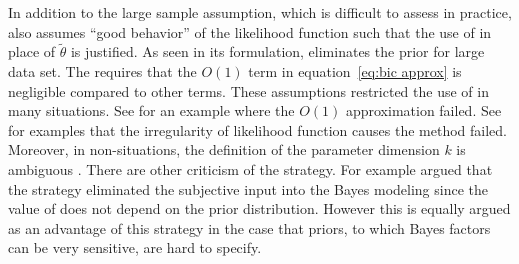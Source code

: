 In addition to the large sample assumption, which is difficult to assess in
practice, \bic also assumes ``good behavior'' of the likelihood function such
that the use of \mle in place of $\tilde\theta$ is justified. As seen in its
formulation, \bic eliminates the prior for large data set.  The \bic requires
that the $O(1)$ term in equation~\eqref{eq:bic approx} is negligible compared
to other terms. These assumptions restricted the use of \bic in many
situations.  See \cite{Gelfand:1994ux} for an example where the $O(1)$
approximation failed. See \cite{Berger:2001uy} for examples that the
irregularity of likelihood function causes the \bic method failed. Moreover,
in non-\iid situations, the definition of the parameter dimension $k$ is
ambiguous \cite{Spiegelhalter:1998uc, Kass:1995vb}. There are other criticism
of the \bic strategy.  For example \cite[][sec.~7.2.3]{Robert:2007tc} argued
that the \bic strategy eliminated the subjective input into the Bayes modeling
since the value of \bic does not depend on the prior distribution. However
this is equally argued as an advantage of this strategy in the case that
priors, to which Bayes factors can be very sensitive, are hard to specify.

\ifx\inthesis\undefined
\printbibliography
\else\relax\fi
